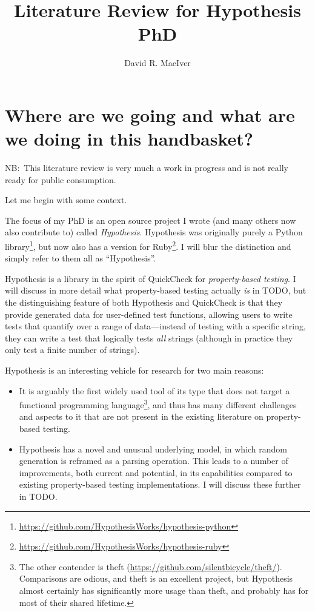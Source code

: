 

\title{Literature Review for Hypothesis PhD}
\author{David R. MacIver}



\maketitle

\tableofcontents

\chapter{Where are we going and what are we doing in this handbasket?}

NB:\ This literature review is very much a work in progress and is not really ready for public consumption.

Let me begin with some context.

The focus of my PhD is an open source project I wrote (and many others now also contribute to) called \emph{Hypothesis}.
Hypothesis was originally purely a Python library\footnote{\url{https://github.com/HypothesisWorks/hypothesis-python}},
but now also has a version for Ruby\footnote{\url{https://github.com/HypothesisWorks/hypothesis-ruby}}.
I will blur the distinction and simply refer to them all as ``Hypothesis''.

Hypothesis is a library in the spirit of QuickCheck\cite{DBLP:conf/icfp/ClaessenH00} for \emph{property-based testing}.
I will discuss in more detail what property-based testing actually \emph{is} in TODO,
but the distinguishing feature of both Hypothesis and QuickCheck is that they provide generated data for user-defined test functions,
allowing users to write tests that quantify over a range of data---instead
of testing with a specific string,
they can write a test that logically tests \emph{all} strings (although in practice they only test a finite number of strings).

Hypothesis is an interesting vehicle for research for two main reasons:

\begin{itemize}
\item It is arguably the first widely used tool of its type that does not target a functional programming language\footnote{
The other contender is theft (\url{https://github.com/silentbicycle/theft/}).
Comparisons are odious,
and theft is an excellent project,
but Hypothesis almost certainly has significantly more usage than theft,
and probably has for most of their shared lifetime.
},
and thus has many different challenges and aspects to it that are not present in the existing literature on property-based testing.
\item Hypothesis has a novel and unusual underlying model,
in which random generation is reframed as a parsing operation.
This leads to a number of improvements,
both current and potential,
in its capabilities compared to existing property-based testing implementations.
I will discuss these further in TODO.\ 
\end{itemize}

